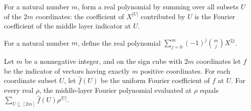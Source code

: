 \begin{definition}
\label{FABL.middleLayerFourierPolynomial}
\leanok
{}
For a natural number $m$, form a real polynomial by summing over all subsets $U$ of the
$2m$ coordinates: the coefficient of $X^{|U|}$ contributed by $U$ is the Fourier
coefficient of the middle layer indicator at $U$.
\end{definition}

\begin{definition}
\label{FABL.middleLayerBinomialPolynomial}
\leanok
For a natural number $m$, define the real polynomial
$\sum_{j=0}^{m}(-1)^j\binom{m}{j}X^{2j}$.
\end{definition}

\begin{theorem}
\label{FABL.eval_middleLayerFourierPolynomial}
\leanok
{}
Let $m$ be a nonnegative integer, and on the sign cube with $2m$ coordinates let $f$ be
the indicator of vectors having exactly $m$ positive coordinates. For each coordinate
subset $U$, let $\widehat f(U)$ be the uniform Fourier coefficient of $f$ at $U$. For
every real $\rho$, the middle-layer Fourier polynomial evaluated at $\rho$ equals
$\sum_{U\subseteq[2m]}\widehat f(U)\rho^{|U|}$.
\end{theorem}

